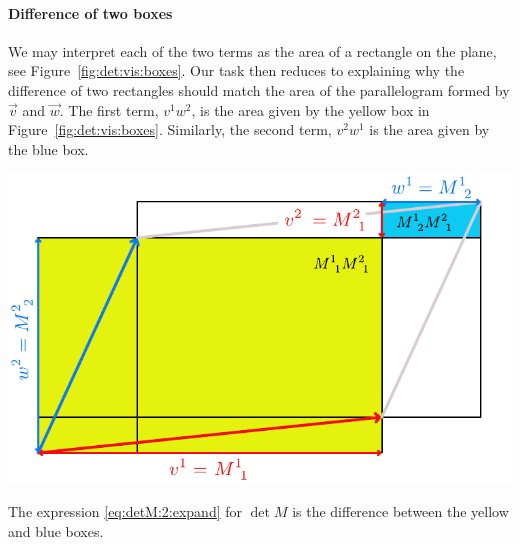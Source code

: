\documentclass[12pt, oneside]{report}    %
\begin{document}
\paragraph{Difference of two boxes} We may interpret each of the two terms as the area of a rectangle on the plane, see Figure~\ref{fig:det:vis:boxes}. Our task then reduces to explaining why the difference of two rectangles should match the area of the parallelogram formed by $\vec{v}$ and $\vec{w}$. The first term, $v^1w^2$, is the area given by the yellow box in Figure~\ref{fig:det:vis:boxes}. Similarly, the second term, $v^2w^1$ is the area given by the blue box.
\begin{marginfigure}%
    \includegraphics[width=\textwidth]{figures/det TwoPiecesofDet.pdf}
    \caption{The expression \eqref{eq:detM:2:expand} for $\det M$ is the difference between the yellow and blue boxes.}
        \label{fig:det:vis:boxes}
\end{marginfigure}
\end{document}
